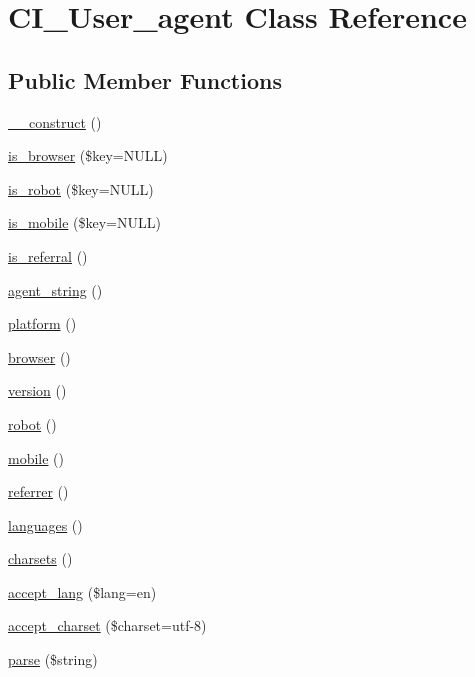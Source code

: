 \hypertarget{class_c_i___user__agent}{}\section{C\+I\+\_\+\+User\+\_\+agent Class Reference}
\label{class_c_i___user__agent}
\subsection*{Public Member Functions}
\begin{DoxyCompactItemize}
\item 
\mbox{\hyperlink{class_c_i___user__agent_a855f58dba6facaba68b4ca266de0a264}{\+\_\+\+\_\+construct}} ()
\item 
\mbox{\hyperlink{class_c_i___user__agent_ac3ede100994463947a4bf725ae71f1ec}{is\+\_\+browser}} (\$key=N\+U\+LL)
\item 
\mbox{\hyperlink{class_c_i___user__agent_a0277d914261032a961d2a8e7cb758a4b}{is\+\_\+robot}} (\$key=N\+U\+LL)
\item 
\mbox{\hyperlink{class_c_i___user__agent_ae3ba8ad834f68efdf7e320a077c15dff}{is\+\_\+mobile}} (\$key=N\+U\+LL)
\item 
\mbox{\hyperlink{class_c_i___user__agent_a05cf61e04f177ac408c56d092d37aa95}{is\+\_\+referral}} ()
\item 
\mbox{\hyperlink{class_c_i___user__agent_a71f3bb99b71e2297a5a281c4ea6d5eb0}{agent\+\_\+string}} ()
\item 
\mbox{\hyperlink{class_c_i___user__agent_ab169095ba39467d0c16f92f0dfe5b68e}{platform}} ()
\item 
\mbox{\hyperlink{class_c_i___user__agent_a5a14c05298e3d01f82c562b0e1a8a3c6}{browser}} ()
\item 
\mbox{\hyperlink{class_c_i___user__agent_a1a948b9d835ccac64ce166e735b49b38}{version}} ()
\item 
\mbox{\hyperlink{class_c_i___user__agent_a79f8212e8fe40e7e902f7fc0e0b03d7d}{robot}} ()
\item 
\mbox{\hyperlink{class_c_i___user__agent_ab9bc60c3f41edbe9b150e327028e212c}{mobile}} ()
\item 
\mbox{\hyperlink{class_c_i___user__agent_a234ef733fad2effab4da28114d3142d8}{referrer}} ()
\item 
\mbox{\hyperlink{class_c_i___user__agent_a3c7f05c22ad81e0904f6799a242c0bd0}{languages}} ()
\item 
\mbox{\hyperlink{class_c_i___user__agent_a8a41120cc77aa7937953eb0f37635428}{charsets}} ()
\item 
\mbox{\hyperlink{class_c_i___user__agent_a1765c08f52cd43e31b80f894a3b6fe71}{accept\+\_\+lang}} (\$lang=\textquotesingle{}en\textquotesingle{})
\item 
\mbox{\hyperlink{class_c_i___user__agent_a41af7ee92c2d42abd9e2c5fedf8ca9a8}{accept\+\_\+charset}} (\$charset=\textquotesingle{}utf-\/8\textquotesingle{})
\item 
\mbox{\hyperlink{class_c_i___user__agent_af91e04c44f0aa65869a9f9013d854c03}{parse}} (\$string)
\end{DoxyCompactItemize}
